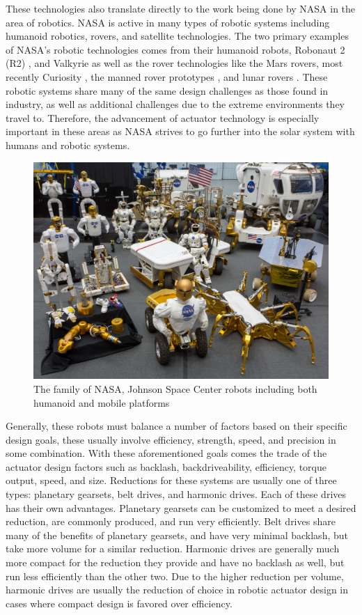 These technologies also translate directly to the work being done by NASA in the area of robotics. 
NASA is active in many types of robotic systems including humanoid robotics, rovers, and satellite technologies. 
The two primary examples of NASA's robotic technologies comes from their humanoid robots, Robonaut 2 (R2) \cite{ref:r2}, and Valkyrie \cite{ref:valkyrie} as well as the rover technologies like the Mars rovers, most recently Curiosity \cite{ref:curiosity}, the manned rover prototypes \cite{ref:rover}, and lunar rovers \cite{ref:RP}. 
These robotic systems share many of the same design challenges as those found in industry, as well as additional challenges due to the extreme environments they travel to. Therefore, the advancement of actuator technology is especially important in these areas as NASA strives to go further into the solar system with humans and robotic systems. 

\begin{figure}[h]
   \centering
   \includegraphics[width=0.7\linewidth]{fig/robot_collage}
   \caption{The family of NASA, Johnson Space Center robots including both humanoid and mobile platforms}
   \label{fig/robot_collage}
\end{figure}


Generally, these robots must balance a number of factors based on their specific design goals, these usually involve efficiency, strength, speed, and precision in some combination. 
With these aforementioned goals comes the trade of the actuator design factors such as backlash, backdriveability, efficiency, torque output, speed, and size. 
Reductions for these systems are usually one of three types: planetary gearsets, belt drives, and harmonic drives. 
Each of these drives has their own advantages. 
Planetary gearsets can be customized to meet a desired reduction, are commonly produced, and run very efficiently.
Belt drives share many of the benefits of planetary gearsets, and have very minimal backlash, but take more volume for a similar reduction. 
Harmonic drives are generally much more compact for the reduction they provide and have no backlash as well, but run less efficiently than the other two. 
Due to the higher reduction per volume, harmonic drives are usually the reduction of choice in robotic actuator design in cases where compact design is favored over efficiency.

